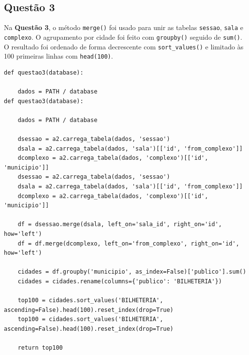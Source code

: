 \documentclass{article}
\begin{document}
\subsection*{Questão 3}
Na \textbf{Questão 3}, o método \texttt{merge()} foi usado para unir as tabelas \texttt{sessao}, \texttt{sala} e \texttt{complexo}. O agrupamento por cidade foi feito com \texttt{groupby()} seguido de \texttt{sum()}. O resultado foi ordenado de forma decrescente com \texttt{sort\_values()} e limitado às 100 primeiras linhas com \texttt{head(100)}.
\linespread{1}
\begin{lstlisting}
def questao3(database):

    dados = PATH / database
def questao3(database):

    dados = PATH / database
    
    dsessao = a2.carrega_tabela(dados, 'sessao')
    dsala = a2.carrega_tabela(dados, 'sala')[['id', 'from_complexo']]
    dcomplexo = a2.carrega_tabela(dados, 'complexo')[['id', 'municipio']]
    dsessao = a2.carrega_tabela(dados, 'sessao')
    dsala = a2.carrega_tabela(dados, 'sala')[['id', 'from_complexo']]
    dcomplexo = a2.carrega_tabela(dados, 'complexo')[['id', 'municipio']]

    df = dsessao.merge(dsala, left_on='sala_id', right_on='id', how='left')
    df = df.merge(dcomplexo, left_on='from_complexo', right_on='id', how='left')

    cidades = df.groupby('municipio', as_index=False)['publico'].sum()
    cidades = cidades.rename(columns={'publico': 'BILHETERIA'})

    top100 = cidades.sort_values('BILHETERIA', ascending=False).head(100).reset_index(drop=True)
    top100 = cidades.sort_values('BILHETERIA', ascending=False).head(100).reset_index(drop=True)

    return top100
\end{lstlisting}
\linespread{1.5}
\end{document}
